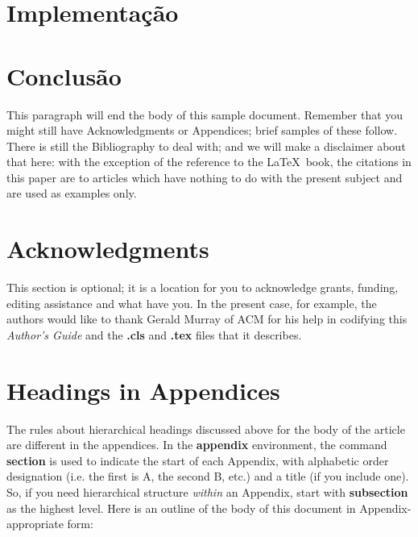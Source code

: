 \documentclass{acm_proc_article-sp}
\begin{document}
		
\section{Implementação}

\section{Conclusão}
This paragraph will end the body of this sample document.
Remember that you might still have Acknowledgments or
Appendices; brief samples of these
follow.  There is still the Bibliography to deal with; and
we will make a disclaimer about that here: with the exception
of the reference to the \LaTeX\ book, the citations in
this paper are to articles which have nothing to
do with the present subject and are used as
examples only.

\section{Acknowledgments}
This section is optional; it is a location for you
to acknowledge grants, funding, editing assistance and
what have you.  In the present case, for example, the
authors would like to thank Gerald Murray of ACM for
his help in codifying this \textit{Author's Guide}
and the \textbf{.cls} and \textbf{.tex} files that it describes.

%

%
%
\appendix
\section{Headings in Appendices}
The rules about hierarchical headings discussed above for
the body of the article are different in the appendices.
In the \textbf{appendix} environment, the command
\textbf{section} is used to
indicate the start of each Appendix, with alphabetic order
designation (i.e. the first is A, the second B, etc.) and
a title (if you include one).  So, if you need
hierarchical structure
\textit{within} an Appendix, start with \textbf{subsection} as the
highest level. Here is an outline of the body of this
document in Appendix-appropriate form:
\end{document}
